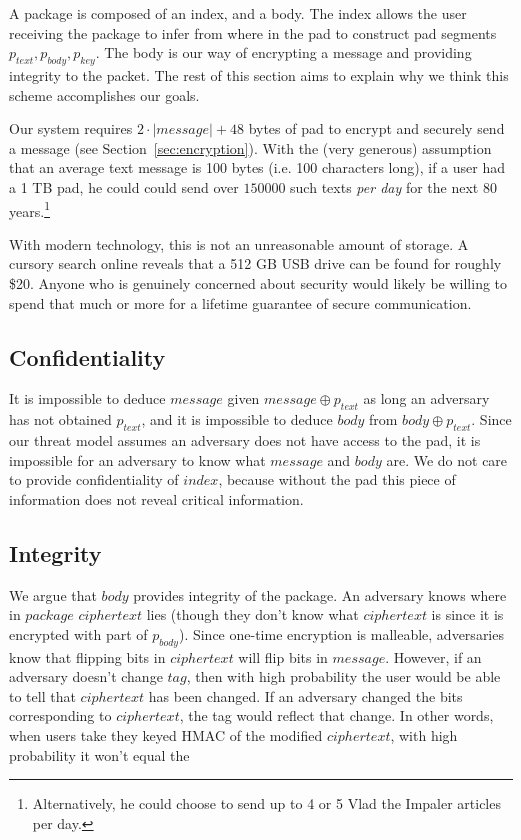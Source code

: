 \documentclass[twocolumn]{article}
\begin{document}
A package is composed of an index, and a body. The index allows the user receiving the package to infer from where in the pad to construct pad segments $p_{text}, p_{body}, p_{key}$. The body is our way of encrypting a message and providing integrity to the packet. The rest of this section aims to explain why we think this scheme accomplishes our goals.  

Our system requires $2\cdot |message| + 48$ bytes of pad to encrypt and securely send a message (see Section~\ref{sec:encryption}). With the (very generous) assumption that an average text message is 100 bytes (i.e. 100 characters long), if a user had a 1 TB pad, he could could send over $150000$ such texts \emph{per day} for the next 80 years.\footnote{
Alternatively, he could choose to send up to 4 or 5 Vlad the Impaler articles per day.
}

With modern technology, this is not an unreasonable amount of storage. A cursory search online reveals that a 512 GB USB drive can be found for roughly \$20. Anyone who is genuinely concerned about security would likely be willing to spend that much or more for a lifetime guarantee of secure communication.

\subsection{Confidentiality}
It is impossible to deduce $message$ given $message \oplus p_{text}$
as long an adversary has not obtained $p_{text}$, and it is impossible to deduce $body$ from $body \oplus p_{text}$. Since our threat model assumes an adversary does not have access to the pad, it is impossible for an adversary to know what $message$ and $body$ are. We do not care to provide confidentiality of $index$, because without the pad this piece of information does not reveal critical information. 

\subsection{Integrity}
We argue that $body$ provides integrity of the package. An adversary knows where in $package$ $ciphertext$ lies (though they don't know what $ciphertext$ is since it is encrypted with part of $p_{body}$). Since one-time encryption is malleable, adversaries know that flipping bits in $ciphertext$ will flip bits in $message$. However, if an adversary doesn't change $tag$, then with high probability the user would be able to tell that $ciphertext$ has been changed.
If an adversary changed the bits corresponding to $ciphertext$, the tag would reflect that change. In other words, when users take they keyed HMAC of the modified $ciphertext$, with high probability it won't equal the  
\end{document}
